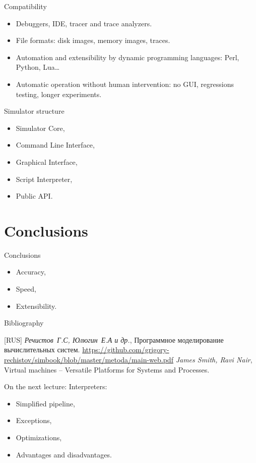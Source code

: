 \begin{frame}{Compatibility}
\begin{itemize}
\item Debuggers, IDE, tracer and trace analyzers.
\item File formats: disk images, memory images, traces.
\item Automation and extensibility by dynamic programming languages: Perl,
  Python, Lua\dots
\item Automatic operation without human intervention: no GUI, regressions
  testing, longer experiments.
\end{itemize}
\end{frame}

\begin{frame}{Simulator structure}
\begin{itemize}
\item Simulator Core,
\item Command Line Interface,
\item Graphical Interface,
\item Script Interpreter,
\item Public API.
\end{itemize}
\end{frame}

\section{Conclusions}

\begin{frame}{Conclusions}
\begin{itemize}
\item Accuracy,
\item Speed,
\item Extensibility.
\end{itemize}
\end{frame}

\begin{frame}[allowframebreaks]{Bibliography}
\begin{thebibliography}{99}
  \bibitem{} [RUS] \textit{Речистов~Г.С, Юлюгин~Е.А и др.},
    Программное моделирование вычислительных систем.
    \url{https://github.com/grigory-rechistov/simbook/blob/master/metoda/main-web.pdf}
  \bibitem{} \textit{James Smith, Ravi Nair}, Virtual machines -- Versatile
    Platforms for Systems and Processes.
\end{thebibliography}
\end{frame}

\begin{frame}{On the next lecture:}
Interpreters:
\begin{itemize}
\item Simplified pipeline,
\item Exceptions,
\item Optimizations,
\item Advantages and disadvantages.
\end{itemize}
\end{frame}

\finalslide


